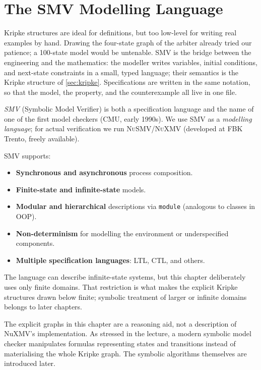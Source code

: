 \section{The SMV Modelling Language}
\label{sec:smv-lang}

Kripke structures are ideal for definitions, but too low-level for
writing real examples by hand.  Drawing the four-state graph of the
arbiter already tried our patience; a 100-state model would be
untenable.  SMV is the bridge between the engineering and the
mathematics: the modeller writes variables, initial conditions, and
next-state constraints in a small, typed language; their semantics is the
Kripke structure of \cref{sec:kripke}.  Specifications are
written in the same notation, so that the model, the property, and the
counterexample all live in one file.

\emph{SMV} (Symbolic Model Verifier) is both a specification language and the
name of one of the first model checkers (CMU, early 1990s).  We use SMV as a
\emph{modelling language}; for actual verification we run
\textsc{NuSMV}/\textsc{NuXMV} (developed at FBK Trento, freely available).

SMV supports:
\begin{itemize}
  \item \textbf{Synchronous and asynchronous} process composition.
  \item \textbf{Finite-state and infinite-state} models.
  \item \textbf{Modular and hierarchical} descriptions via
        \texttt{module} (analogous to classes in OOP).
  \item \textbf{Non-determinism} for modelling the environment or
        underspecified components.
  \item \textbf{Multiple specification languages}: LTL, CTL, and others.
\end{itemize}

The language can describe infinite-state systems, but this chapter deliberately
uses only finite domains.  That restriction is what makes the explicit Kripke
structures drawn below finite; symbolic treatment of larger or infinite
domains belongs to later chapters.

The explicit graphs in this chapter are a reasoning aid, not a description of
NuXMV's implementation.  As stressed in the lecture, a modern symbolic model
checker manipulates formulas representing states and transitions instead of
materialising the whole Kripke graph.  The symbolic algorithms themselves are
introduced later.


